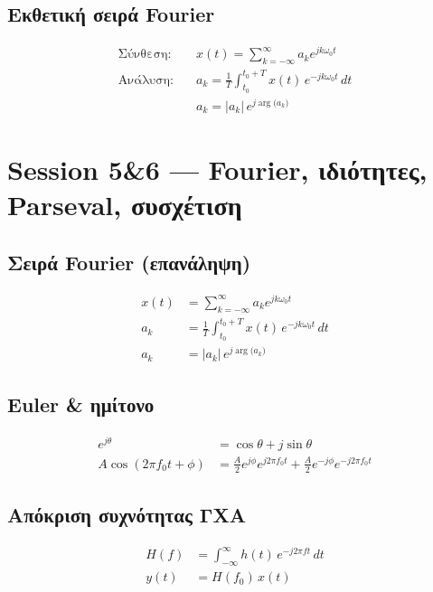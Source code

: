 \documentclass[11pt,a4paper]{article}
\newcommand{\argof}[1]{\operatorname{arg}\bigl(#1\bigr)}
\begin{document}
\subsection{Εκθετική σειρά Fourier}
\begin{align}
\text{Σύνθεση:} \quad & x(t) = \sum_{k=-\infty}^{\infty} a_k e^{jk\omega_0 t} \\
\text{Ανάλυση:} \quad & a_k = \frac{1}{T}\int_{t_0}^{t_0+T} x(t)\,e^{-jk\omega_0 t}\,dt \\
& a_k = |a_k|\,e^{j\argof{a_k}}
\end{align}

\section{Session 5\&6 — Fourier, ιδιότητες, Parseval, συσχέτιση}

\subsection{Σειρά Fourier (επανάληψη)}
\begin{align}
x(t) &= \sum_{k=-\infty}^{\infty} a_k e^{jk\omega_0 t} \\
a_k &= \frac{1}{T}\int_{t_0}^{t_0+T} x(t)\,e^{-jk\omega_0 t}\,dt \\
a_k &= |a_k|\,e^{j\argof{a_k}}
\end{align}

\subsection{Euler \& ημίτονο}
\begin{align}
e^{j\theta} &= \cos\theta + j\sin\theta \\
A\cos(2\pi f_0 t + \phi) &= \frac{A}{2}e^{j\phi}e^{j2\pi f_0 t} + \frac{A}{2}e^{-j\phi}e^{-j2\pi f_0 t}
\end{align}

\subsection{Απόκριση συχνότητας ΓΧΑ}
\begin{align}
H(f) &= \int_{-\infty}^{\infty} h(t)\,e^{-j2\pi f t}\,dt \\
y(t) &= H(f_0)\,x(t)
\end{align}
\end{document}
